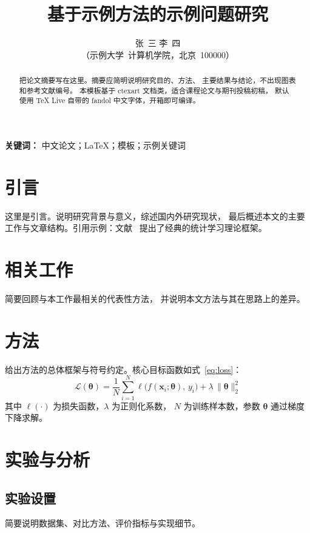 \documentclass[
  UTF8,
  fontset=fandol,        %
  zihao=-4,              %
  a4paper,
]{ctexart}
\title{\heiti 基于示例方法的示例问题研究}
\author{
  张~三 \quad 李~四 \\
  （示例大学~计算机学院，北京~100000）
}
\date{}  %
\newcommand{\vect}[1]{\boldsymbol{#1}}
\newenvironment{keywords}{\noindent\textbf{关键词：}}{\par}
\begin{document}
\maketitle

\begin{abstract}
  把论文摘要写在这里。摘要应简明说明研究目的、方法、
  主要结果与结论，不出现图表和参考文献编号。
  本模板基于 ctexart 文档类，适合课程论文与期刊投稿初稿，
  默认使用 TeX Live 自带的 fandol 中文字体，开箱即可编译。
\end{abstract}

\begin{keywords}
  中文论文；\LaTeX{}；模板；示例关键词
\end{keywords}

\section{引言}
这里是引言。说明研究背景与意义，综述国内外研究现状，
最后概述本文的主要工作与文章结构。引用示例：文献~\cite{vapnik2000}
提出了经典的统计学习理论框架。

\section{相关工作}
简要回顾与本工作最相关的代表性方法，
并说明本文方法与其在思路上的差异。

\section{方法}
给出方法的总体框架与符号约定。核心目标函数如式~\eqref{eq:loss}：
\begin{equation}
  \mathcal{L}(\vect{\theta}) =
  \frac{1}{N} \sum_{i=1}^{N}
  \ell \bigl( f(\vect{x}_i; \vect{\theta}),\, y_i \bigr)
  + \lambda \, \lVert \vect{\theta} \rVert_2^2
  \label{eq:loss}
\end{equation}
其中 $\ell(\cdot)$ 为损失函数，$\lambda$ 为正则化系数，
$N$ 为训练样本数，参数 $\vect{\theta}$ 通过梯度下降求解。

\section{实验与分析}
\subsection{实验设置}
简要说明数据集、对比方法、评价指标与实现细节。
\end{document}

